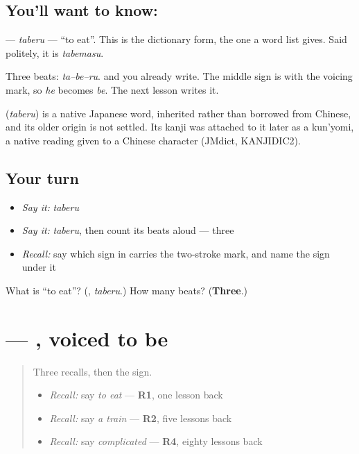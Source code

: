 \subsection*{You'll want to know: }
\textbf{} — \emph{taberu} — \textquotedblleft{}to eat\textquotedblright{}. This is the dictionary form, the one a word list gives. Said politely, it is \emph{tabemasu}.

Three beats: \emph{ta–be–ru}. \textbf{} and \textbf{} you already write. The middle sign is \textbf{} with the voicing mark, so \emph{he} becomes \emph{be}. The next lesson writes it.

\begin{cousinweb}
\textbf{} (\emph{taberu}) is a native Japanese word, inherited rather than borrowed from Chinese, and its older origin is not settled. Its kanji was attached to it later as a kun'yomi, a native reading given to a Chinese character (JMdict, KANJIDIC2).
\end{cousinweb}

\subsection*{Your turn}
\begin{itemize}
\raggedright
  \item \emph{Say it:} \emph{taberu}
  \item \emph{Say it:} \emph{taberu}, then count its beats aloud — three
  \item \emph{Recall:} say which sign in \textbf{} carries the two-stroke mark, and name the sign under it
\end{itemize}

\begin{tcolorbox}[breakable,colback=teal!4,colframe=teal!35!black,title={Before you move on}]
What is \textquotedblleft{}to eat\textquotedblright{}? (\textbf{}, \emph{taberu}.) How many beats? (\textbf{Three}.)
\end{tcolorbox}
\section[\texorpdfstring{\ja{べ} (be)}{べ (be)}]{ — , voiced to be}

\label{lesson:JA-W134-be}



\begin{quote}
Three recalls, then the sign.

\begin{itemize}
\raggedright
  \item \emph{Recall:} say \emph{to eat} — \textbf{R1}, one lesson back
  \item \emph{Recall:} say \emph{a train} — \textbf{R2}, five lessons back
  \item \emph{Recall:} say \emph{complicated} — \textbf{R4}, eighty lessons back
\end{itemize}
\end{quote}

